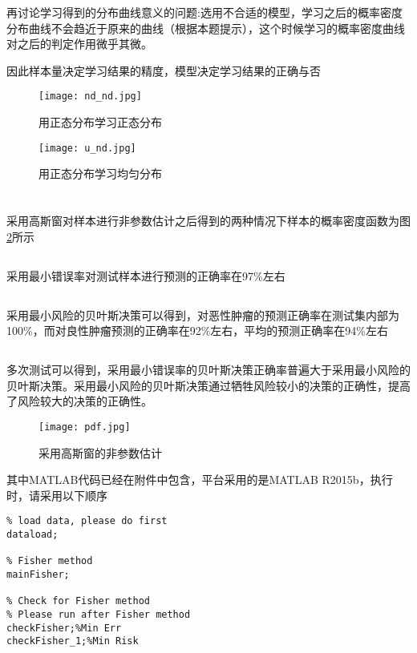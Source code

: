 \documentclass[UTF8,a4paper]{ctexart}
\begin{document}
再讨论学习得到的分布曲线意义的问题:选用不合适的模型，学习之后的概率密度分布曲线不会趋近于原来的曲线（根据本题提示），这个时候学习的概率密度曲线对之后的判定作用微乎其微。

因此样本量决定学习结果的精度，模型决定学习结果的正确与否

\begin{figure}
\centering
\texttt{[image: nd\_nd.jpg]}
\caption{用正态分布学习正态分布}
\label{nd_nd}
\texttt{[image: u\_nd.jpg]}
\caption{用正态分布学习均匀分布}
\label{u_nd}
\end{figure}
\section{}
\subsection{}
采用高斯窗对样本进行非参数估计之后得到的两种情况下样本的概率密度函数为图\ref{pdf}所示
\subsection{}
采用最小错误率对测试样本进行预测的正确率在97\%左右
\subsection{}
采用最小风险的贝叶斯决策可以得到，对恶性肿瘤的预测正确率在测试集内部为100\%，而对良性肿瘤预测的正确率在92\%左右，平均的预测正确率在94\%左右
\subsection{}
多次测试可以得到，采用最小错误率的贝叶斯决策正确率普遍大于采用最小风险的贝叶斯决策。采用最小风险的贝叶斯决策通过牺牲风险较小的决策的正确性，提高了风险较大的决策的正确性。
\clearpage
\begin{figure}
\centering
\texttt{[image: pdf.jpg]}
\caption{采用高斯窗的非参数估计}
\label{pdf}
\end{figure}
其中MATLAB代码已经在附件中包含，平台采用的是MATLAB R2015b，执行时，请采用以下顺序
\lstset{language=Matlab}
\begin{lstlisting}
% load data, please do first
dataload; 

% Fisher method
mainFisher; 

% Check for Fisher method
% Please run after Fisher method
checkFisher;%Min Err 
checkFisher_1;%Min Risk
\end{lstlisting}
\end{document}
